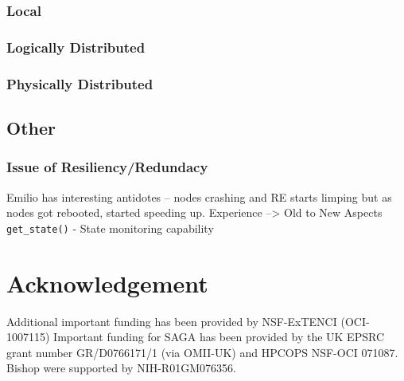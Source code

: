 \documentclass{sig-alternate}
\begin{document}
\subsubsection{Local}
\subsubsection{Logically Distributed}
\subsubsection{Physically Distributed}

\subsection{Other}

\subsubsection{Issue of Resiliency/Redundacy} Emilio has interesting
antidotes -- nodes crashing and RE starts limping but as nodes got
rebooted, started speeding up.  Experience --> Old to New Aspects
\texttt{get\_state()} - State monitoring capability


\section*{Acknowledgement}
\footnotesize{Additional important
  funding has been provided by NSF-ExTENCI (OCI-1007115) Important
  funding for SAGA has been provided by the UK EPSRC grant number
  GR/D0766171/1 (via OMII-UK) and HPCOPS NSF-OCI 071087. Bishop were
  supported by NIH-R01GM076356.}


%
%
\end{document}
